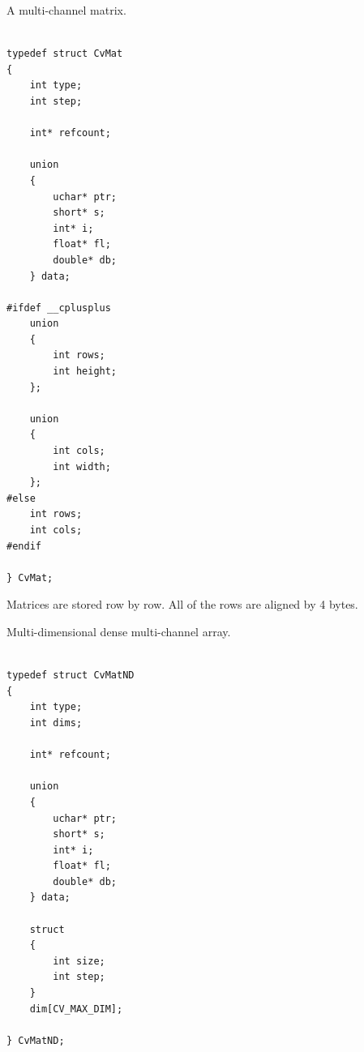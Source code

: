 \label{CvMat}

A multi-channel matrix.

\begin{lstlisting}

typedef struct CvMat
{
    int type; 
    int step; 

    int* refcount; 

    union
    {
        uchar* ptr;
        short* s;
        int* i;
        float* fl;
        double* db;
    } data; 

#ifdef __cplusplus
    union
    {
        int rows;
        int height;
    };

    union
    {
        int cols;
        int width;
    };
#else
    int rows; 
    int cols; 
#endif

} CvMat;

\end{lstlisting}

\begin{description}
\end{description}


Matrices are stored row by row. All of the rows are aligned by 4 bytes.


\label{CvMatND}

Multi-dimensional dense multi-channel array.

\begin{lstlisting}

typedef struct CvMatND
{
    int type; 
    int dims;

    int* refcount; 

    union
    {
        uchar* ptr;
        short* s;
        int* i;
        float* fl;
        double* db;
    } data; 

    struct
    {
        int size;
        int step;
    }
    dim[CV_MAX_DIM];

} CvMatND;

\end{lstlisting}

\begin{description}
\end{description}

